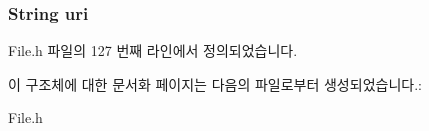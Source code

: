 \hypertarget{struct___audio_extends_ac0b02717b928a36338653c49b0821365}{
\subsubsection[{uri}]{\setlength{\rightskip}{0pt plus 5cm}String uri}}\label{struct___audio_extends_ac0b02717b928a36338653c49b0821365}


File.\-h 파일의 127 번째 라인에서 정의되었습니다.



이 구조체에 대한 문서화 페이지는 다음의 파일로부터 생성되었습니다.\-:\begin{DoxyCompactItemize}
\item 
File.\-h\end{DoxyCompactItemize}
